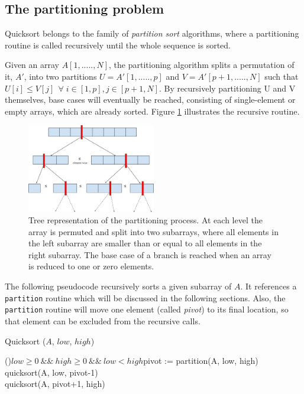 \documentclass[]{finalproject}
\begin{document}
\subsection{The partitioning problem}

Quicksort belongs to the family of \textit{partition sort} algorithms, where a partitioning routine is called recursively until the whole sequence is sorted.

Given an array $A[1,.....,N]$, the partitioning algorithm splits a permutation of it, $A'$, into two partitions $U=A'[1,.....,p]$ and $V=A'[p+1,.....,N]$
such that $U[i] \leq V[j] \;\, \forall \; i \in [1,p], j \in [p+1,N]$. By recursively partitioning U and V themselves, base cases will eventually be reached,
consisting of single-element or empty arrays, which are already sorted. Figure \ref{fig:rec-part} illustrates the recursive routine.

\begin{figure}[H]
\centering
\includegraphics[width=0.5\textwidth]{recursive_partitioning.png}
\caption{Tree representation of the partitioning process.
At each level the array is permuted and split into two subarrays, where all elements in the left subarray are smaller than or equal to all elements in the right subarray.
The base case of a branch is reached when an array is reduced to one or zero elements.}
\label{fig:rec-part}
\end{figure}

The following pseudocode recursively sorts a given subarray of $A$.
It references a \texttt{partition} routine which will be discussed in the following sections.
Also, the \texttt{partition} routine will move one element (called \textit{pivot}) to its final location,
so that element can be excluded from the recursive calls.

\begin{algorithm}
\caption{Quicksort ($A$, $low$, $high$)}
\label{alg:p1}
\If(){$low \geq 0 ~\&\&~ high \geq 0 ~\&\&~ low < high$}{pivot := partition(A, low, high)\\
quicksort(A, low, pivot-1)\\
quicksort(A, pivot+1, high)}
\end{algorithm}
\end{document}
